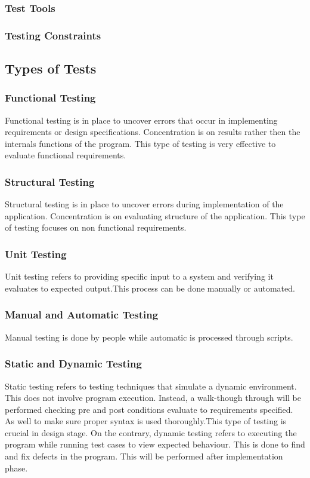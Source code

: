 \documentclass[12pt]{article}
\begin{document}
\subsubsection{Test Tools}


\subsubsection{ Testing Constraints}

\subsection{Types of Tests}

\subsubsection{Functional Testing}
Functional testing is in place to uncover errors that occur in implementing requirements or design specifications. Concentration is on results rather then the internals functions of the program. This type of testing is very effective to evaluate functional requirements.

\subsubsection{Structural Testing}
Structural testing is in place to uncover errors during implementation of the application. Concentration is on evaluating structure of the application. This type of testing focuses on non functional requirements.  

\subsubsection{Unit Testing}
Unit testing refers to providing specific input to a system and verifying it evaluates to expected output.This process can be done manually or automated.

\subsubsection{Manual and Automatic Testing}
Manual testing is done by people while automatic is processed through scripts. 

\subsubsection{Static and Dynamic Testing}
Static testing refers to testing techniques that simulate a dynamic environment. This does not involve program execution. Instead, a walk-though through will be performed checking pre and post conditions evaluate to requirements specified. As well to make sure proper syntax is used thoroughly.This type of testing is crucial in design stage. On the contrary, dynamic testing refers to executing the program while running test cases to view expected behaviour. This is done to find and fix defects in the program. This will be performed after implementation phase. 
\end{document}
